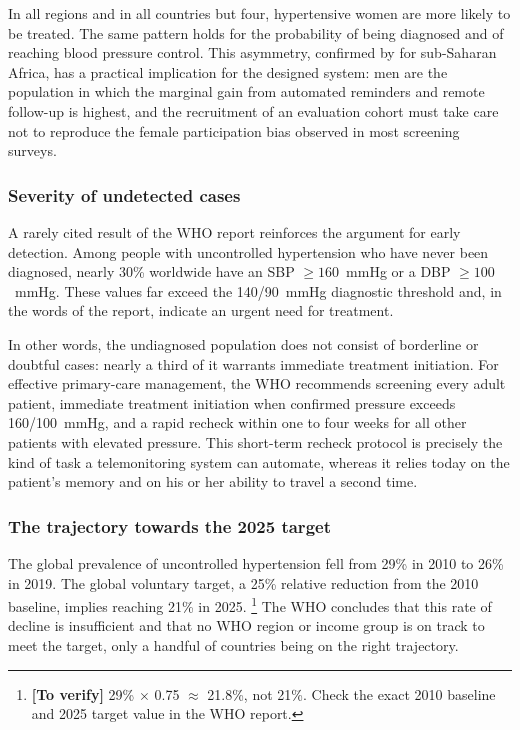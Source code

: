 \documentclass[12pt,a4paper,oneside]{report}
\newcommand{\verify}[1]{\footnote{\textbf{[To verify]} #1}}
\begin{document}
In all regions and in all countries but four, hypertensive women are more likely to be treated. The same pattern holds for the probability of being diagnosed and of reaching blood pressure control. This asymmetry, confirmed by \textcite{gafane2025} for sub-Saharan Africa, has a practical implication for the designed system: men are the population in which the marginal gain from automated reminders and remote follow-up is highest, and the recruitment of an evaluation cohort must take care not to reproduce the female participation bias observed in most screening surveys.

\subsubsection{Severity of undetected cases}

A rarely cited result of the WHO report reinforces the argument for early detection. Among people with uncontrolled hypertension who have never been diagnosed, nearly 30\% worldwide have an SBP $\geq 160$~mmHg or a DBP $\geq 100$~mmHg. These values far exceed the 140/90~mmHg diagnostic threshold and, in the words of the report, indicate an urgent need for treatment.

In other words, the undiagnosed population does not consist of borderline or doubtful cases: nearly a third of it warrants immediate treatment initiation. For effective primary-care management, the WHO recommends screening every adult patient, immediate treatment initiation when confirmed pressure exceeds 160/100~mmHg, and a rapid recheck within one to four weeks for all other patients with elevated pressure. This short-term recheck protocol is precisely the kind of task a telemonitoring system can automate, whereas it relies today on the patient's memory and on his or her ability to travel a second time.

\subsubsection{The trajectory towards the 2025 target}

The global prevalence of uncontrolled hypertension fell from 29\% in 2010 to 26\% in 2019. The global voluntary target, a 25\% relative reduction from the 2010 baseline, implies reaching 21\% in 2025.%
\verify{29\% $\times$ 0.75 $\approx$ 21.8\%, not 21\%. Check the exact 2010 baseline and 2025 target value in the WHO report.}
The WHO concludes that this rate of decline is insufficient and that no WHO region or income group is on track to meet the target, only a handful of countries being on the right trajectory.
\end{document}
